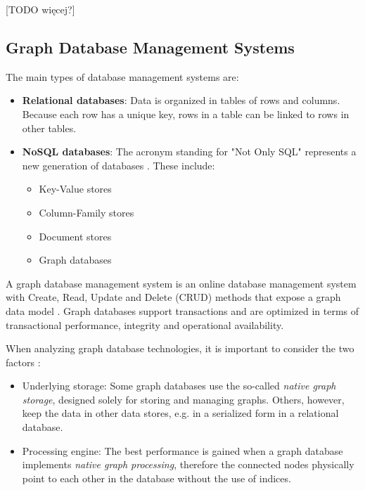 \documentclass[12pt]{report}
\begin{document}
[TODO więcej?]

\subsection{Graph Database Management Systems}

The main types of database management systems are:
\begin{itemize}
\item {\bf Relational databases}: Data is organized in tables of rows and columns. Because each row has a unique key, rows in a table can be linked to rows in other tables.
\item {\bf NoSQL databases}: The acronym standing for "Not Only SQL" represents a new generation of databases \cite{learning_neo4j}. These include:
\begin{itemize}
\item Key-Value stores
\item Column-Family stores
\item Document stores
\item Graph databases
\end{itemize}
\end{itemize}

A graph database management system is an online database management system with Create, Read, Update and Delete (CRUD) methods that expose a graph data model \cite{graph_databases}. Graph databases support transactions and are optimized in terms of transactional performance, integrity and operational availability.

When analyzing graph database technologies, it is important to consider the two factors \cite{graph_databases}:
\begin{itemize}
\item Underlying storage: Some graph databases use the so-called \textit{native graph storage}, designed solely for storing and managing graphs. Others, however, keep the data in other data stores, e.g. in a serialized form in a relational database.
\item Processing engine: The best performance is gained when a graph database implements \textit{native graph processing}, therefore the connected nodes physically point to each other in the database without the use of indices.
\end{itemize}
\end{document}
